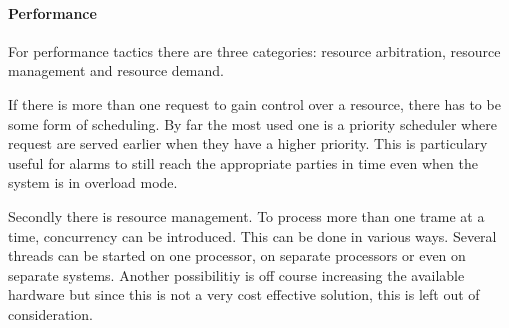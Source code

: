 % 
% 
% 

\paragraph{Performance} 

\npar For performance tactics there are three categories: resource
arbitration, resource management and resource demand.

\npar If there is more than one request to gain control over a resource, there
has to be some form of scheduling. By far the most used one is a priority
scheduler where request are served earlier when they have a higher priority.
This is particulary useful for alarms to still reach the appropriate parties in
time even when the system is in overload mode. 

\npar Secondly there is resource management. To process more than one trame at a
time, concurrency can be introduced. This can be done in various ways. Several
threads can be started on one processor, on separate processors or even on
separate systems. Another possibilitiy is off course increasing the available
hardware but since this is not a very cost effective solution, this is left out
of consideration.

